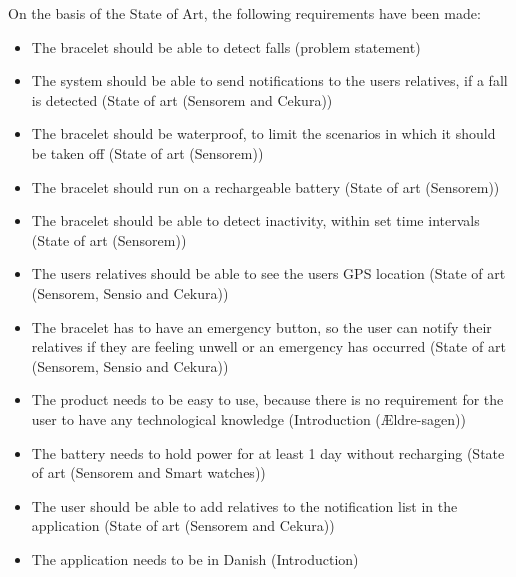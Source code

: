 On the basis of the State of Art, the following requirements have been made:

\begin{itemize}
    \item The bracelet should be able to detect falls (problem statement)
    \item The system should be able to send notifications to the users relatives, if a fall is detected (State of art (Sensorem and Cekura)) 
    \item The bracelet should be waterproof, to limit the scenarios in which it should be taken off  (State of art (Sensorem))
    \item The bracelet should run on a rechargeable battery (State of art (Sensorem))
    \item The bracelet should be able to detect inactivity, within set time intervals (State of art (Sensorem))
    \item The users relatives should be able to see the users GPS location (State of art (Sensorem, Sensio and Cekura))
    \item  The bracelet has to have an emergency button, so the user can notify their relatives if they are feeling unwell or an emergency has occurred (State of art (Sensorem, Sensio and Cekura))
    \item The product needs to be easy to use, because there is no requirement for the user to have any technological knowledge (Introduction (Ældre-sagen))
    \item The battery needs to hold power for at least 1 day without recharging (State of art (Sensorem and Smart watches))
    \item The user should be able to add relatives to the notification list in the application (State of art (Sensorem and Cekura))
    \item The application needs to be in Danish (Introduction)
\end{itemize}